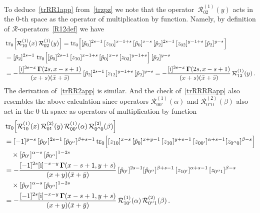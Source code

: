 \documentclass[a4paper,11pt]{article}
\renewcommand{\imath}{\mathrm{i}}
\newcommand{\tr}{\mathop{\rm tr}\nolimits}
\numberwithin{equation}{section}
\begin{document}
To deduce~\eqref{trRR1app} from~\eqref{trzpz} we note that the operator~$\mathcal{R}^{(1)}_{02}(y)$ acts in the $0$-th space as the operator of multiplication by function.
Namely, by definition of $\mathcal{R}$-operators~\eqref{R12def} we have
\begin{align}
	& \nonumber
	\tr_0\Bigl[\mathcal{R}^{(1)}_{10}(x)\,\mathcal{R}^{(1)}_{02}(y)\Bigr] =
	\tr_0\Bigl[[\hat{p}_0]^{2s-1}\,[z_{10}]^{x-1+s}\,[\hat{p}_0]^{x-s}\,[\hat{p}_2]^{2s-1}\,[z_{02}]^{y-1+s}\,[\hat{p}_2]^{y-s}\Bigr] \\
	& \nonumber
	=
	[\hat{p}_2]^{2s-1}\,
	\tr_0\Bigl[[\hat{p}_0]^{2s-1}\,[z_{10}]^{x-1+s}\,[\hat{p}_0]^{x-s}\,[z_{02}]^{y-1+s}\Bigr] \, [\hat{p}_2]^{y-s} \\
	& \nonumber
	=
	-\frac{[\imath]^{3s-x}\,\mathbf{\Gamma}(2s, x-s+1)}{(x+s)(\bar{x}+\bar{s})} \,
	[\hat{p}_2]^{2s-1}\,[z_{12}]^{y-1+s}\,[\hat{p}_2]^{y-s}
	= -\frac{[\imath]^{3s-x}\,\mathbf{\Gamma}(2s, x-s+1)}{(x+s)(\bar{x}+\bar{s})} \,
	\mathcal{R}^{(1)}_{12}(y) \,.
\end{align}
The derivation of~\eqref{trRR2app} is similar.
And the check of~\eqref{trRRRRapp} also resembles the above calculation since operators $\mathcal{R}^{(1)}_{00'}(\alpha)$ and $\mathcal{R}^{(2)}_{0''0}(\beta)$ also act in the $0$-th space as operators of multiplication by function
\begin{align}
	& \nonumber
	\tr_0\Bigl[\mathcal{R}^{(1)}_{10}(x)\,\mathcal{R}^{(2)}_{01}(y)\,\mathcal{R}^{(1)}_{00'}(\alpha)\,\mathcal{R}^{(2)}_{0''0}(\beta)\Bigr] \\
	& \nonumber
	=
	[-1]^{y-s}\,[\hat{p}_{0'}]^{2s-1}\,[\hat{p}_{0''}]^{\beta+s-1}
	\tr_0\Bigl[[z_{10}]^{x-s}\,[\hat{p}_0]^{x+y-1}\,[z_{10}]^{y+s-1}\,[z_{00'}]^{\alpha+s-1}[z_{0''0}]^{\beta-s}\Bigr] \\
	& \nonumber
	\quad \times [\hat{p}_{0'}]^{\alpha-s}\,[\hat{p}_{0''}]^{1-2s} \\
	& \nonumber
	=
	-\frac{[-1]^{2s} [\imath]^{-x-y}\,\mathbf{\Gamma}(x-s+1, y+s)}{(x+y)(\bar{x}+\bar{y})}
	\,[\hat{p}_{0'}]^{2s-1}[\hat{p}_{0''}]^{\beta+s-1} \,
	[z_{10'}]^{\alpha+s-1}\,[z_{0''1}]^{\beta-s} \\
	& \nonumber
	\quad \times [\hat{p}_{0'}]^{\alpha-s}\,[\hat{p}_{0''}]^{1-2s} \\
	& \nonumber
	= -\frac{[-1]^{2s} [\imath]^{-x-y}\,\mathbf{\Gamma}(x-s+1, y+s)}{(x+y)(\bar{x}+\bar{y})} \,
	\mathcal{R}^{(1)}_{10'}(\alpha)\,\mathcal{R}^{(2)}_{0''1}(\beta) \,.
\end{align}
\end{document}
